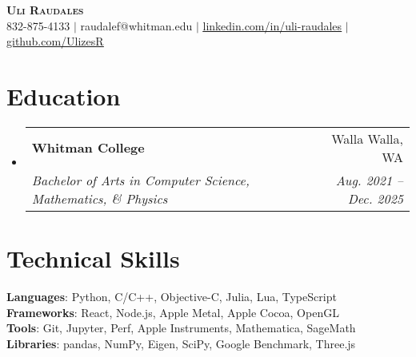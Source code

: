 \documentclass[letterpaper,11pt]{article}
\makeatletter
\newcommand{\resumeSubheading}[4]{
  \vspace{-2pt}\item
    \begin{tabular*}{0.97\textwidth}[t]{l@{\extracolsep{\fill}}r}
      \textbf{#1} & #2 \\
      \textit{\small#3} & \textit{\small #4} \\
    \end{tabular*}\vspace{-7pt}
}
\newcommand{\resumeSubHeadingListStart}{\begin{itemize}[leftmargin=0.15in, label={}]}
\newcommand{\resumeSubHeadingListEnd}{\end{itemize}}
\makeatother
\begin{document}
\begin{center}
    \textbf{\Huge \scshape Uli Raudales} \\ \vspace{1pt}
    \small 832-875-4133 $|$ raudalef@whitman.edu $|$ 
    \href{https://linkedin.com/in/uli-raudales-3120b629a/}{\underline{linkedin.com/in/uli-raudales}} $|$
    \href{https://github.com/UlizesR}{\underline{github.com/UlizesR}}
\end{center}

\section{Education}
  \resumeSubHeadingListStart
    \resumeSubheading
      {Whitman College}{Walla Walla, WA}
      {Bachelor of Arts in Computer Science, Mathematics, \& Physics}{Aug. 2021 -- Dec. 2025}
  \resumeSubHeadingListEnd

\section{Technical Skills}
 \begin{itemize}[leftmargin=0.15in, label={}]
    \small{\item{
     \textbf{Languages}{: Python, C/C++, Objective-C, Julia, Lua, TypeScript} \\
     \textbf{Frameworks}{: React, Node.js, Apple Metal, Apple Cocoa, OpenGL} \\
     \textbf{Tools}{: Git, Jupyter, Perf, Apple Instruments, Mathematica, SageMath} \\
     \textbf{Libraries}{: pandas, NumPy, Eigen, SciPy, Google Benchmark, Three.js} \\
    }}
 \end{itemize}


\end{document}
